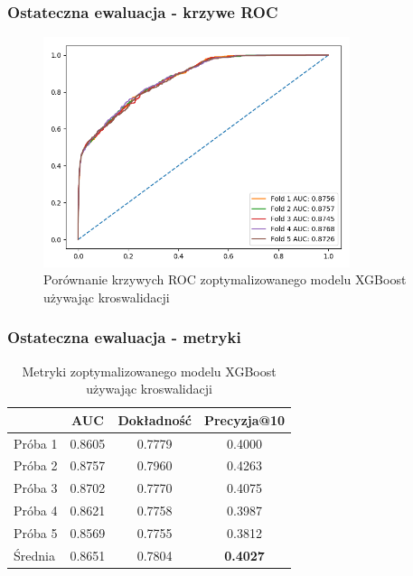 \documentclass{beamer}
\begin{document}
    \begin{frame}
        \frametitle{Ostateczna ewaluacja - krzywe ROC}
        \begin{figure}[!h]
            \centering
            \includegraphics[width=0.8\textwidth]{../images/xgb-roc-comparison.png}
            \caption{Porównanie krzywych ROC zoptymalizowanego modelu XGBoost używając kroswalidacji}
            \label{fig:xgb-roc-comparison}
        \end{figure}
    \end{frame}

    \begin{frame}
        \frametitle{Ostateczna ewaluacja - metryki}
        \begin{table}
            \begin{tabular}{l|*{3}{c}}
                & AUC & Dokładność & Precyzja@10 \\
                \hline
                Próba 1 & 0.8605 & 0.7779 & 0.4000 \\
                Próba 2 & 0.8757 & 0.7960 & 0.4263 \\
                Próba 3 & 0.8702 & 0.7770 & 0.4075 \\
                Próba 4 & 0.8621 & 0.7758 & 0.3987 \\
                Próba 5 & 0.8569 & 0.7755 & 0.3812 \\
                \hline
                Średnia & 0.8651 & 0.7804 & \textbf{0.4027} \\
            \end{tabular}
            \caption{Metryki zoptymalizowanego modelu XGBoost używając kroswalidacji}
            \label{tab:xgb-score-comparison1}
        \end{table}
    \end{frame}
\end{document}
